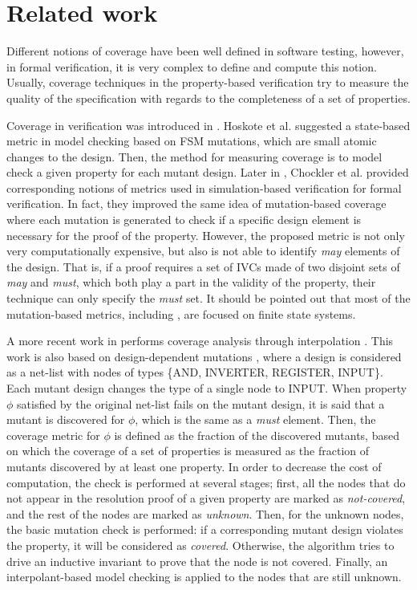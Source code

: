\section{Related work}
\label{sec:related}

Different notions of coverage have been well defined in software testing, however, in formal verification, it is very complex to define and compute this notion.
Usually, coverage techniques in the property-based verification try to measure the quality of the specification with regards to the completeness of a set of properties.

Coverage in verification was introduced in \cite{hoskote1999coverage, katz1999have}. Hoskote et al. \cite{hoskote1999coverage} suggested a state-based metric in model checking based on FSM mutations, which are small atomic changes to the design. Then, the method for measuring coverage is to model check a given property for each mutant design.
Later in \cite{chockler_coverage_2003}, Chockler et al. provided corresponding notions of metrics used in simulation-based verification for formal verification. In fact, they improved the same idea of mutation-based coverage where each mutation is generated to check if a specific
design element is necessary for the proof of the property.
 However, the proposed metric is not only very computationally expensive, but also is not able to identify \emph{may} elements of the design.  That is, if a proof requires a set of IVCs made of two disjoint sets of \emph{may} and \emph{must}, which both play a part in the validity of the property, their technique can only specify the \emph{must} set. It should be pointed out that most of the mutation-based metrics, including \cite{kupferman_theory_2008, chockler2001practical}, are focused on finite state systems.

A more recent work in \cite{chockler2010coverage} performs coverage analysis through interpolation \cite{mcmillan2003interpolation}. This work is also based on design-dependent mutations \cite{chockler_coverage_2003}, where a design is considered as a net-list with nodes of types \{AND, INVERTER, REGISTER, INPUT\}. Each mutant design changes the type of a single node to INPUT. When property $\phi$ satisfied by the original net-list fails on the mutant design, it is said that a mutant is discovered for $\phi$, which is the same as a \emph{must} element.
Then, the coverage metric for $\phi$ is defined as the fraction of the discovered mutants, based on which the coverage of a set of properties is measured as the fraction of mutants discovered by at least one property.
In order to decrease the cost of computation, the check is performed at several stages; first, all the nodes that do not appear in the resolution proof of a given property are marked as \emph{not-covered}, and the rest of the nodes are marked as \emph{unknown}. Then, for the unknown nodes, the basic mutation check is performed: if a corresponding mutant design violates the property, it will be considered as \emph{covered}. Otherwise, the algorithm tries to drive an inductive invariant to prove that the node is not covered. Finally, an interpolant-based model checking is applied to the nodes that are still unknown.

